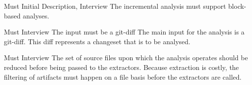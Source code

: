 \documentclass[a4paper]{article}
\begin{document}
\begin{req}
	\reqtable
	{Must}  {Initial Description, Interview}
	{The incremental analysis must support block-based analyses.}
	{}
	
	\begin{subreq} \label{req:git-diff}
		\reqtable
		{Must}  {Interview}
		{The input must be a git-diff}
		{The main input for the analysis is a git-diff. This diff represents a changeset that is to be analysed.}
	\end{subreq}
\end{req}


\begin{req} \label{req:early-filtering}
\reqtable
	{Must}  {Interview}
	{The set of source files upon which the analysis operates should be reduced before being passed to the extractors.}
	{Because extraction is costly, the filtering of artifacts must happen on a file basis before the extractors are called.}
\end{req}
\end{document}
